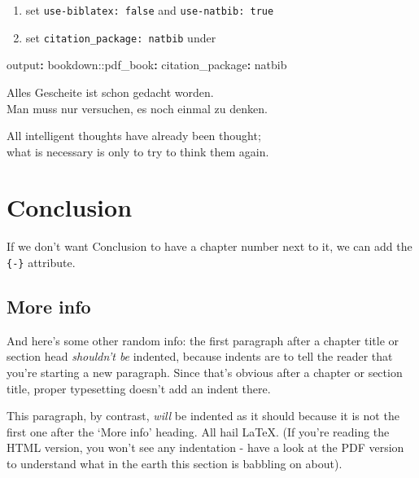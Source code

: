 \documentclass[a4paper, nobind]{templates/ociamthesis}
\providecommand{\tightlist}{%
  \setlength{\itemsep}{0pt}\setlength{\parskip}{0pt}}
\newenvironment{Shaded}{\begin{snugshade}}{\end{snugshade}}
\newcommand{\AttributeTok}[1]{\textcolor[rgb]{0.77,0.63,0.00}{#1}}
\newcommand{\FunctionTok}[1]{\textcolor[rgb]{0.00,0.00,0.00}{#1}}
\newcommand{\KeywordTok}[1]{\textcolor[rgb]{0.13,0.29,0.53}{\textbf{#1}}}
\renewenvironment{Shaded}
{
  \vspace{10pt}%
  \begin{snugshade}%
}{%
  \end{snugshade}%
  \vspace{8pt}%
}
\begin{document}
\begin{enumerate}
\def\labelenumi{\arabic{enumi}.}
\tightlist
\item
  set \texttt{use-biblatex:\ false} and \texttt{use-natbib:\ true}
\item
  set \texttt{citation\_package:\ natbib} under
\end{enumerate}

\begin{Shaded}
\begin{Highlighting}[]
\FunctionTok{output}\KeywordTok{:}
\AttributeTok{  bookdown:}\FunctionTok{:pdf\_book}\KeywordTok{:}
\AttributeTok{    }\FunctionTok{citation\_package}\KeywordTok{:}\AttributeTok{ natbib}
\end{Highlighting}
\end{Shaded}

\begin{savequote}
Alles Gescheite ist schon gedacht worden.\\
Man muss nur versuchen, es noch einmal zu denken.

All intelligent thoughts have already been thought;\\
what is necessary is only to try to think them again.
\end{savequote}



\hypertarget{conclusion}{%
\chapter*{Conclusion}\label{conclusion}}

If we don't want Conclusion to have a chapter number next to it, we can add the \texttt{\{-\}} attribute.

\hypertarget{more-info}{%
\section*{More info}\label{more-info}}

And here's some other random info:
the first paragraph after a chapter title or section head \emph{shouldn't be} indented, because indents are to tell the reader that you're starting a new paragraph.
Since that's obvious after a chapter or section title, proper typesetting doesn't add an indent there.

This paragraph, by contrast, \emph{will} be indented as it should because it is not the first one after the `More info' heading.
All hail LaTeX. (If you're reading the HTML version, you won't see any indentation - have a look at the PDF version to understand what in the earth this section is babbling on about).
\end{document}

